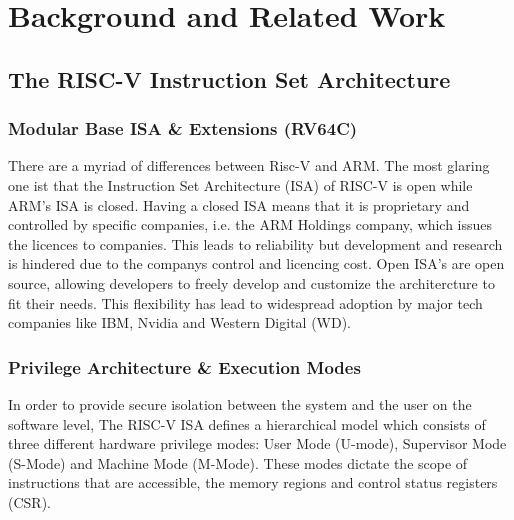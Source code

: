 
\chapter{Background and Related Work}\doublespacing %

\label{Chapter2}


\section{The RISC-V Instruction Set Architecture}

\subsection{Modular Base ISA \& Extensions (RV64C)}





There are a myriad of differences between Risc-V and ARM. %
The most glaring one ist that the Instruction Set Architecture (ISA) of RISC-V is open while ARM's ISA is closed. Having a closed ISA means that it is proprietary and controlled by specific companies, i.e. the ARM Holdings company, which issues the licences to companies.
This leads to reliability but development and research is hindered due to the companys control and licencing cost. Open ISA's are open source, allowing developers to freely develop and customize the architercture to fit their needs. %
This flexibility has lead to widespread adoption by major tech companies like IBM, Nvidia and Western Digital (WD). 

\subsection{Privilege Architecture \& Execution Modes} %

In order to provide secure isolation between the system and the user on the software level, The RISC-V ISA defines a hierarchical model which consists of three different hardware privilege modes: User Mode (U-mode), Supervisor Mode (S-Mode) and Machine Mode (M-Mode). 
These modes dictate the scope of instructions that are accessible, the memory regions and control status registers (CSR).

